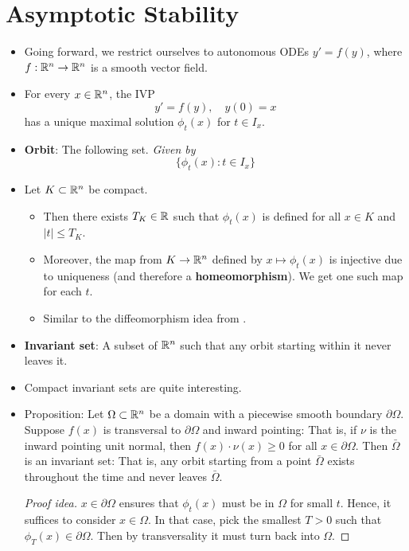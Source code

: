\documentclass[../notes.tex]{subfiles}
\begin{document}
\section{Asymptotic Stability}
\begin{itemize}
    \item {}Going forward, we restrict ourselves to autonomous ODEs $y'=f(y)$, where $f:\mathbb{R}^n\to\mathbb{R}^n$ is a smooth vector field.
    \item For every $x\in\mathbb{R}^n$, the IVP
    \begin{equation*}
        y' = f(y)
        ,\quad
        y(0) = x
    \end{equation*}
    has a unique maximal solution $\phi_t(x)$ for $t\in I_x$.
    \item \textbf{Orbit}: The following set. \emph{Given by}
    \begin{equation*}
        \{\phi_t(x):t\in I_x\}
    \end{equation*}
    \item Let $K\subset\mathbb{R}^n$ be compact.
    \begin{itemize}
        \item Then there exists $T_K\in\mathbb{R}$ such that $\phi_t(x)$ is defined for all $x\in K$ and $|t|\leq T_K$.
        \item Moreover, the map from $K\to\mathbb{R}^n$ defined by $x\mapsto\phi_t(x)$ is injective due to uniqueness (and therefore a \textbf{homeomorphism}). We get one such map for each $t$.
        \item Similar to the diffeomorphism idea from \textcite{bib:DifferentialForms}.
    \end{itemize}
    \item \textbf{Invariant set}: A subset of $\mathbb{R}^n$ such that any orbit starting within it never leaves it.
    \item Compact invariant sets are quite interesting.
    \item Proposition: Let $\Omega\subset\mathbb{R}^n$ be a domain with a piecewise smooth boundary $\partial\Omega$. Suppose $f(x)$ is transversal to $\partial\Omega$ and inward pointing: That is, if $\nu$ is the inward pointing unit normal, then $f(x)\cdot\nu(x)\geq 0$ for all $x\in\partial\Omega$. Then $\bar{\Omega}$ is an invariant set: That is, any orbit starting from a point $\bar{\Omega}$ exists throughout the time and never leaves $\bar{\Omega}$.
    \begin{proof}[Proof idea]
        $x\in\partial\Omega$ ensures that $\phi_t(x)$ must be in $\Omega$ for small $t$. Hence, it suffices to consider $x\in\Omega$. In that case, pick the smallest $T>0$ such that $\phi_T(x)\in\partial\Omega$. Then by transversality it must turn back into $\Omega$.

\end{proof}
\end{itemize}
\end{document}
